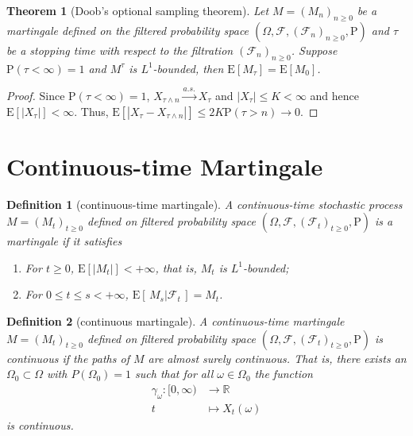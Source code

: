 \documentclass{report}
\newtheorem{definition}{Definition}[section]
\newtheorem{theorem}{Theorem}[section]
\theoremstyle{nonumberplain}
\newtheorem{proof}{Proof.}
\begin{document}
\begin{theorem}[Doob's optional sampling theorem]
Let $M=(M_{n})_{n\ge0}$ be a martingale defined on the filtered probability space $(\Omega,\mathcal{F},(\mathcal{F}_{n})_{n\ge0},\mathrm{P})$ and $\tau$ be a stopping time with respect to the filtration $(\mathcal{F}_{n})_{n\ge 0}$. Suppose $\mathrm{P}(\tau<\infty)=1$ and $M^\tau$ is $L^1$-bounded, then $\mathrm{E}[M_\tau]=\mathrm{E}[M_{0}]$.
\end{theorem}
\begin{proof}	
Since $\mathrm{P}(\tau<\infty)=1$, $X_{\tau \wedge n} \stackrel{a.s.}{\longrightarrow}X_{\tau}$ and $\left|X_{\tau}\right| \leq K<\infty$ and hence $\mathrm{E}\left[\left|X_{\tau}\right|\right]<\infty .$ Thus, $\mathrm{E}\left[\left|X_{\tau}-X_{\tau \wedge n}\right| \right]\leq 2 K \mathrm{P}(\tau>n) \rightarrow 0$.
\end{proof}

\section{Continuous-time Martingale}
\begin{definition}[continuous-time martingale]
	A continuous-time stochastic process $M=(M_t)_{t\ge 0}$ defined on filtered probability space $(\Omega,\mathcal{F},(\mathcal{F}_{t})_{t\ge0},\mathrm{P})$ is a \emph{martingale} if it satisfies
	\begin{enumerate}
		\item For $t\ge0$, $\mathrm{E}[|M_t|]<+\infty$, that is, $M_t$ is $L^1$-bounded;
		\item For $0\le t\le s<+\infty$, $\mathrm{E}[\,M_{s}|\mathcal{F}_t\,]=M_t$.
	\end{enumerate}
\end{definition}
\begin{definition}[continuous martingale]
	A continuous-time martingale $M=(M_t)_{t\ge 0}$ defined on filtered probability space $(\Omega,\mathcal{F},(\mathcal{F}_{t})_{t\ge0},\mathrm{P})$ is continuous if the paths of $M$ are almost surely continuous. That is, there exists an $\Omega_{0} \subset \Omega$ with $P\left(\Omega_{0}\right)=1$ such that for all $\omega \in \Omega_{0}$ the function
	\begin{align*}
	\gamma_\omega:[0, \infty)&\longrightarrow\mathbb{R}\\
	t&\longmapsto X_{t}(\omega)
	\end{align*}
	is continuous.
\end{definition}
\end{document}
